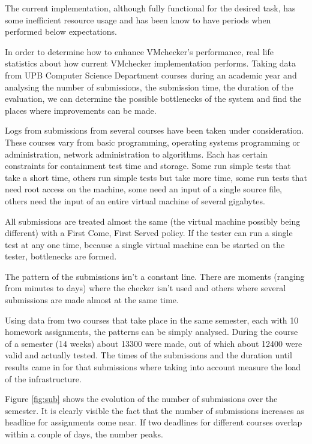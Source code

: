 
The current implementation, although fully functional for the desired task,
has some inefficient resource usage and has been know to have periods when
performed below expectations.

In order to determine how to enhance VMchecker's performance, real life
statistics about how current VMchecker implementation performs. Taking data
from UPB Computer Science Department courses during an academic year and
analysing the number of submissions, the submission time, the duration of
the evaluation, we can determine the possible bottlenecks of the system and
find the places where improvements can be made.

Logs from submissions from several courses have been taken under
consideration. These courses vary from basic programming, operating systems programming or
administration, network administration to algorithms. Each has certain
constraints for containment test time and storage. Some run simple tests
that take a short time, others run simple tests but take more time, some
run tests that need root access on the machine, some need an input of a
single source file, others need the input of an entire virtual machine of
several gigabytes.

All submissions are treated almost the same (the virtual machine possibly
being different) with a First Come, First Served policy. If the tester can
run a single test at any one time, because a single virtual machine can be
started on the tester, bottlenecks are formed.

The pattern of the submissions isn't a constant line. There are moments
(ranging from minutes to days) where the checker isn't used and others
where several submissions are made almost at the same time.

Using data from two courses that take place in the same semester, each with
10 homework assignments, the patterns can be simply analysed. During the
course of a semester (14 weeks) about 13300 were made, out of which about
12400 were valid and actually tested. The times of the submissions and the
duration until results came in for that submissions where taking into
account measure the load of the infrastructure.

Figure \ref{fig:sub} shows the evolution of the number of submissions over
the semester. It is clearly visible the fact that the number of submissions
increases as headline for assignments come near. If two deadlines for
different courses overlap within a couple of days, the number peaks.

